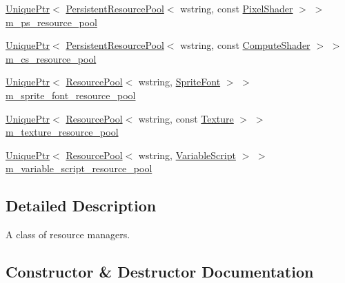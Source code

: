 \begin{DoxyCompactItemize}
\item 
\hyperlink{namespacemage_a3316d7143a973e37adf1110f2e80ca31}{Unique\+Ptr}$<$ \hyperlink{classmage_1_1_persistent_resource_pool}{Persistent\+Resource\+Pool}$<$ wstring, const \hyperlink{namespacemage_a27ecaf266420ee7a494d64edc0757129}{Pixel\+Shader} $>$ $>$ \hyperlink{classmage_1_1_resource_manager_ab271d7c35552e28b3b79cb10fea5cf72}{m\+\_\+ps\+\_\+resource\+\_\+pool}
\item 
\hyperlink{namespacemage_a3316d7143a973e37adf1110f2e80ca31}{Unique\+Ptr}$<$ \hyperlink{classmage_1_1_persistent_resource_pool}{Persistent\+Resource\+Pool}$<$ wstring, const \hyperlink{namespacemage_ae040329401484b076f0cd1a7c43d19c9}{Compute\+Shader} $>$ $>$ \hyperlink{classmage_1_1_resource_manager_a5c363073fa94f73193faaa1f65365299}{m\+\_\+cs\+\_\+resource\+\_\+pool}
\item 
\hyperlink{namespacemage_a3316d7143a973e37adf1110f2e80ca31}{Unique\+Ptr}$<$ \hyperlink{classmage_1_1_resource_pool}{Resource\+Pool}$<$ wstring, \hyperlink{classmage_1_1_sprite_font}{Sprite\+Font} $>$ $>$ \hyperlink{classmage_1_1_resource_manager_a49369b160a75dee96cdebd2b957ae0c4}{m\+\_\+sprite\+\_\+font\+\_\+resource\+\_\+pool}
\item 
\hyperlink{namespacemage_a3316d7143a973e37adf1110f2e80ca31}{Unique\+Ptr}$<$ \hyperlink{classmage_1_1_resource_pool}{Resource\+Pool}$<$ wstring, const \hyperlink{classmage_1_1_texture}{Texture} $>$ $>$ \hyperlink{classmage_1_1_resource_manager_a267774ad90f546e73a9415e6baa37d2a}{m\+\_\+texture\+\_\+resource\+\_\+pool}
\item 
\hyperlink{namespacemage_a3316d7143a973e37adf1110f2e80ca31}{Unique\+Ptr}$<$ \hyperlink{classmage_1_1_resource_pool}{Resource\+Pool}$<$ wstring, \hyperlink{classmage_1_1_variable_script}{Variable\+Script} $>$ $>$ \hyperlink{classmage_1_1_resource_manager_adc36ebb3e2d04fddc3a23e2f1303dbfe}{m\+\_\+variable\+\_\+script\+\_\+resource\+\_\+pool}
\end{DoxyCompactItemize}


\subsection{Detailed Description}
A class of resource managers. 

\subsection{Constructor \& Destructor Documentation}
\hypertarget{classmage_1_1_resource_manager_a0ff509899a9fbef2096c60b3d3d80bd5}{}\label{classmage_1_1_resource_manager_a0ff509899a9fbef2096c60b3d3d80bd5} 

